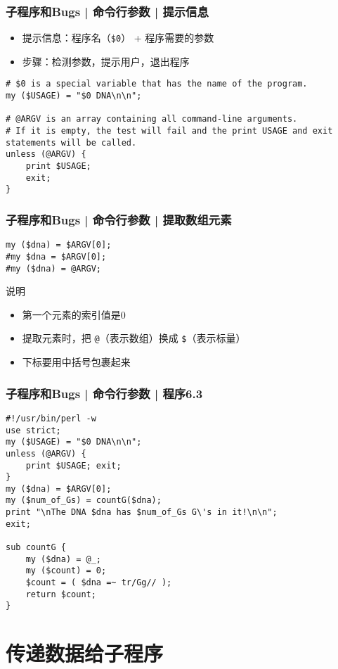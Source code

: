 \begin{frame}[fragile]
  \frametitle{子程序和Bugs | 命令行参数 | \alert{提示信息}}
  \begin{itemize}
    \item 提示信息：程序名（\verb|$0|） + 程序需要的参数
    \item 步骤：检测参数，提示用户，退出程序
  \end{itemize}
\begin{lstlisting}
# $0 is a special variable that has the name of the program.
my ($USAGE) = "$0 DNA\n\n";

# @ARGV is an array containing all command-line arguments.
# If it is empty, the test will fail and the print USAGE and exit statements will be called.
unless (@ARGV) {
    print $USAGE;
    exit;
}
\end{lstlisting}
\end{frame}

\begin{frame}[fragile]
  \frametitle{子程序和Bugs | 命令行参数 | \alert{提取数组元素}}
\begin{lstlisting}
my ($dna) = $ARGV[0];
#my $dna = $ARGV[0];
#my ($dna) = @ARGV;
\end{lstlisting}
\begin{block}{说明}
  \begin{itemize}
    \item 第一个元素的索引值是0
    \item 提取元素时，把 \verb|@|（表示数组）换成 \verb|$|（表示标量）
    \item 下标要用中括号包裹起来
  \end{itemize}
\end{block}
\end{frame}

\begin{frame}[fragile]
  \frametitle{子程序和Bugs | 命令行参数 | \alert{程序6.3}}
\begin{lstlisting}[basicstyle=\small\tt]
#!/usr/bin/perl -w
use strict;
my ($USAGE) = "$0 DNA\n\n";
unless (@ARGV) {
    print $USAGE; exit;
}
my ($dna) = $ARGV[0];
my ($num_of_Gs) = countG($dna);
print "\nThe DNA $dna has $num_of_Gs G\'s in it!\n\n";
exit;

sub countG {
    my ($dna) = @_;
    my ($count) = 0;
    $count = ( $dna =~ tr/Gg// );
    return $count;
}
\end{lstlisting}
\end{frame}

\section{传递数据给子程序}
